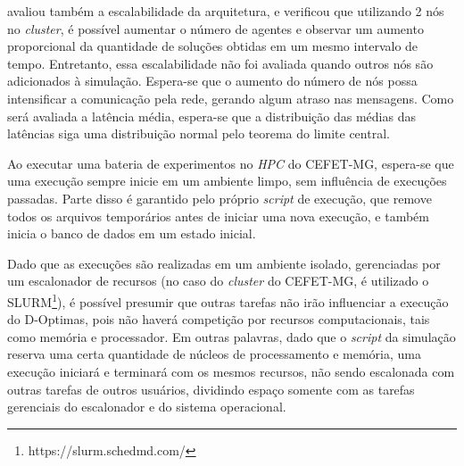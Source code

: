  avaliou também a escalabilidade da arquitetura, e verificou que utilizando 2 nós no \textit{cluster}, é possível aumentar o número de agentes e observar um aumento proporcional da quantidade de soluções obtidas em um mesmo intervalo de tempo. Entretanto, essa escalabilidade não foi avaliada quando outros nós são adicionados à simulação. Espera-se que o aumento do número de nós possa intensificar a comunicação pela rede, gerando algum atraso nas mensagens. Como será avaliada a latência média, espera-se que a distribuição das médias das latências siga uma distribuição normal pelo teorema do limite central.

Ao executar uma bateria de experimentos no \textit{HPC} do CEFET-MG, espera-se que uma execução sempre inicie em um ambiente limpo, sem influência de execuções passadas. Parte disso é garantido pelo próprio \textit{script} de execução, que remove todos os arquivos temporários antes de iniciar uma nova execução, e também inicia o banco de dados em um estado inicial.  

Dado que as execuções são realizadas em um ambiente isolado, gerenciadas por um escalonador de recursos (no caso do \textit{cluster} do CEFET-MG, é utilizado o SLURM\footnote{https://slurm.schedmd.com/}), é possível presumir que outras tarefas não irão influenciar a execução do D-Optimas, pois não haverá competição por recursos computacionais, tais como memória e processador. Em outras palavras, dado que o \textit{script} da simulação reserva uma certa quantidade de núcleos de processamento e memória, uma execução iniciará e terminará com os mesmos recursos, não sendo escalonada com outras tarefas de outros usuários, dividindo espaço somente com as tarefas gerenciais do escalonador e do sistema operacional. 

